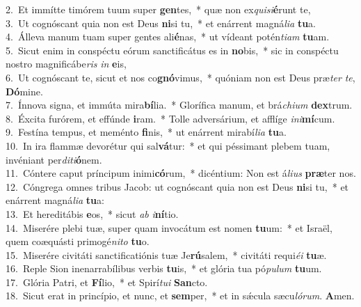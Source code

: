 {2.~}Et immítte timórem tuum super \textbf{gen}tes,~* quæ non ex\textit{qui}\textit{si}\textbf{é}runt te,\\
{3.~}Ut cognóscant quia non est Deus \textbf{ni}si tu,~* et enárrent magná\textit{li}\textit{a} \textbf{tu}a.\\
{4.~}Álleva manum tuam super gentes ali\textbf{é}nas,~* ut vídeant potén\textit{ti}\textit{am} \textbf{tu}am.\\
{5.~}Sicut enim in conspéctu eórum sanctificátus es in \textbf{no}bis,~* sic in conspéctu nostro magnificábe\textit{ris} \textit{in} \textbf{e}is,\\
{6.~}Ut cognóscant te, sicut et nos co\textbf{gnó}vimus,~* quóniam non est Deus præ\textit{ter} \textit{te}, \textbf{Dó}mine.\\
{7.~}Ínnova signa, et immúta mira\textbf{bí}lia.~* Glorífica manum, et brá\textit{chi}\textit{um} \textbf{dex}trum.\\
{8.~}Éxcita furórem, et effúnde \textbf{i}ram.~* Tolle adversárium, et afflíge \textit{i}\textit{ni}\textbf{mí}cum.\\
{9.~}Festína tempus, et meménto \textbf{fi}nis,~* ut enárrent mirabí\textit{li}\textit{a} \textbf{tu}a.\\
{10.~}In ira flammæ devorétur qui sal\textbf{vá}tur:~* et qui péssimant plebem tuam, invéniant per\textit{di}\textit{ti}\textbf{ó}nem.\\
{11.~}Cóntere caput príncipum inimi\textbf{có}rum,~* dicéntium: Non est á\textit{li}\textit{us} \textbf{præ}ter nos.\\
{12.~}Cóngrega omnes tribus Jacob: ut cognóscant quia non est Deus \textbf{ni}si tu,~* et enárrent magná\textit{li}\textit{a} \textbf{tu}a:\\
{13.~}Et hereditábis \textbf{e}os,~* sicut \textit{ab} \textit{i}\textbf{ní}tio.\\
{14.~}Miserére plebi tuæ, super quam invocátum est nomen \textbf{tu}um:~* et Israël, quem coæquásti primogé\textit{ni}\textit{to} \textbf{tu}o.\\
{15.~}Miserére civitáti sanctificatiónis tuæ Je\textbf{rú}salem,~* civitáti requi\textit{é}\textit{i} \textbf{tu}æ.\\
{16.~}Reple Sion inenarrabílibus verbis \textbf{tu}is,~* et glória tua pó\textit{pu}\textit{lum} \textbf{tu}um.\\
{17.~}Glória Patri, et \textbf{Fí}lio,~* et Spirí\textit{tu}\textit{i} \textbf{San}cto.\\
{18.~}Sicut erat in princípio, et nunc, et \textbf{sem}per,~* et in sǽcula sæcu\textit{ló}\textit{rum}. \textbf{A}men.\\
